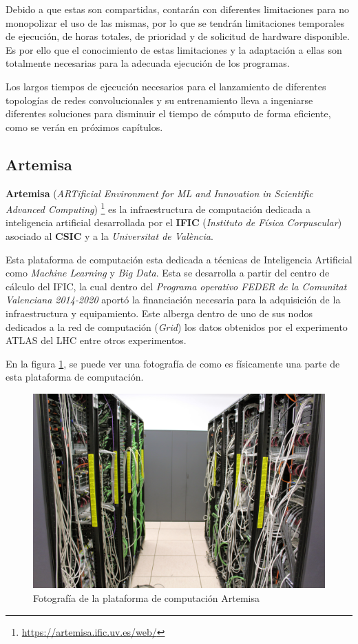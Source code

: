 Debido a que estas son compartidas, contarán con diferentes limitaciones para no monopolizar el uso de las mismas, por lo que se tendrán limitaciones temporales de ejecución, de horas totales, de prioridad y de solicitud de hardware disponible. Es por ello que el conocimiento de estas limitaciones y la adaptación a ellas son totalmente necesarias para la adecuada ejecución de los programas.

Los largos tiempos de ejecución necesarios para el lanzamiento de diferentes topologías de redes convolucionales y su entrenamiento lleva a ingeniarse diferentes soluciones para disminuir el tiempo de cómputo de forma eficiente, como se verán en próximos capítulos.

\subsection{Artemisa}
\textbf{Artemisa} (\textit{ARTificial Environment for ML and Innovation in Scientific Advanced Computing}) \footnote{\url{https://artemisa.ific.uv.es/web/}} es la infraestructura de computación dedicada a inteligencia artificial desarrollada por el \textbf{IFIC} (\textit{Instituto de Física Corpuscular}) asociado al \textbf{CSIC} y a la \textit{Universitat de València}.

Esta plataforma de computación esta dedicada a técnicas de Inteligencia Artificial como \textit{Machine Learning} y \textit{Big Data}. Esta se desarrolla a partir del centro de cálculo del IFIC, la cual dentro del \textit{Programa operativo FEDER de la Comunitat Valenciana 2014-2020} aportó la financiación necesaria para la adquisición de la infraestructura y equipamiento. Este alberga dentro de uno de sus nodos dedicados a la red de computación (\textit{Grid}) los datos obtenidos por el experimento ATLAS del LHC entre otros experimentos. 

En la figura \ref{fig:artemisa}, se puede ver una fotografía de como es físicamente una parte de esta plataforma de computación.

\begin{figure}[ht]
    \centering
    \includegraphics[width=1.0\textwidth]{figuras/centro_calculo_ific.jpg}
    \caption{Fotografía de la plataforma de computación Artemisa}
    \label{fig:artemisa}
\end{figure}

